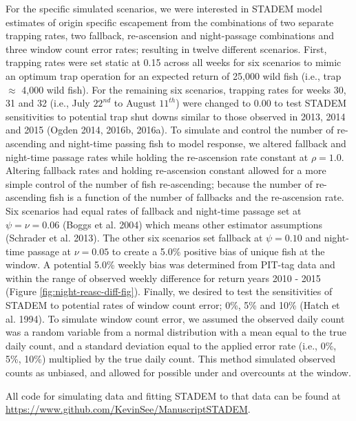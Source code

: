 \documentclass[
  12pt,
]{article}
\begin{document}
For the specific simulated scenarios, we were interested in STADEM model estimates of origin specific escapement from the combinations of two separate trapping rates, two fallback, re-ascension and night-passage combinations and three window count error rates; resulting in twelve different scenarios. First, trapping rates were set static at 0.15 across all weeks for six scenarios to mimic an optimum trap operation for an expected return of 25,000 wild fish (i.e., trap \(\approx\) 4,000 wild fish). For the remaining six scenarios, trapping rates for weeks 30, 31 and 32 (i.e., July \(22^{nd}\) to August \(11^{th}\)) were changed to 0.00 to test STADEM sensitivities to potential trap shut downs similar to those observed in 2013, 2014 and 2015 (Ogden 2014, 2016b, 2016a). To simulate and control the number of re-ascending and night-time passing fish to model response, we altered fallback and night-time passage rates while holding the re-ascension rate constant at \(\rho = 1.0\). Altering fallback rates and holding re-ascension constant allowed for a more simple control of the number of fish re-ascending; because the number of re-ascending fish is a function of the number of fallbacks and the re-ascension rate. Six scenarios had equal rates of fallback and night-time passage set at \(\psi = \nu = 0.06\) (Boggs et al. 2004) which means other estimator assumptions (Schrader et al. 2013). The other six scenarios set fallback at \(\psi = 0.10\) and night-time passage at \(\nu = 0.05\) to create a 5.0\% positive bias of unique fish at the window. A potential 5.0\% weekly bias was determined from PIT-tag data and within the range of observed weekly difference for return years 2010 - 2015 (Figure \ref{fig:night-reasc-diff-fig}). Finally, we desired to test the sensitivities of STADEM to potential rates of window count error; 0\%, 5\% and 10\% (Hatch et al. 1994). To simulate window count error, we assumed the observed daily count was a random variable from a normal distribution with a mean equal to the true daily count, and a standard deviation equal to the applied error rate (i.e., 0\%, 5\%, 10\%) multiplied by the true daily count. This method simulated observed counts as unbiased, and allowed for possible under and overcounts at the window.

All code for simulating data and fitting STADEM to that data can be found at \url{https://www.github.com/KevinSee/ManuscriptSTADEM}.
\end{document}
